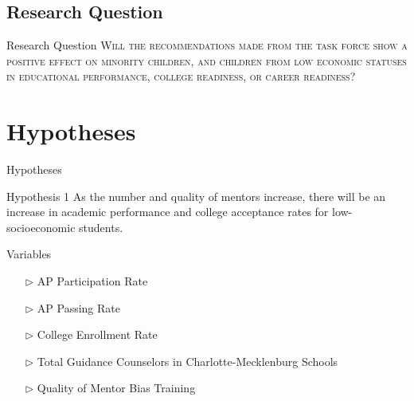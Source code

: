 \documentclass[10pt]{beamer}
\begin{document}
\subsection[Research Question]{Research Question}

\begin{frame}{Research Question}
    \fontsize{12pt}{7.2}
    \large{\textsc{Will the recommendations made from the task force show a positive effect on minority children, and children from low economic statuses in educational performance, college readiness, or career readiness?}}

\end{frame}

\section[Hypotheses]{Hypotheses}

\begin{frame}[fragile]{Hypotheses}
    \fontsize{11pt}{7.2}
    \begin{block}{Hypothesis 1}
        As the number and quality of mentors increase, there will be an increase in academic performance and college acceptance rates for low-socioeconomic students.
    \end{block}

    \pause

    \vspace{.6cm}

    \begin{exampleblock}{Variables}
        \begin{itemize}
            \item[$\triangleright$] AP Participation Rate
            \item[$\triangleright$] AP Passing Rate
            \item[$\triangleright$] College Enrollment Rate 
            \item[$\triangleright$] Total Guidance Counselors in Charlotte-Mecklenburg Schools
            \item[$\triangleright$] Quality of Mentor Bias Training
        \end{itemize}
    \end{exampleblock}

\end{frame}
\end{document}
